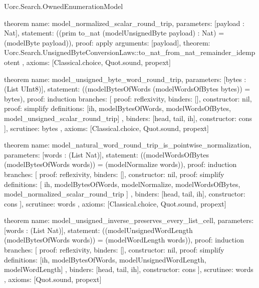 \begin{lexlean}{Uorc.Search.OwnedEnumerationModel}
\begin{semanticmodule}
theorem{
  name: model_normalized_scalar_round_trip,
  parameters: [payload : Nat],
  statement: ((prim to_nat (modelUnsignedByte payload) : Nat) = (modelByte payload)),
  proof: apply{
    arguments: [payload],
    theorem: Uorc.Search.UnsignedByteConversionLaws::to_nat_from_nat_remainder_idempotent
  },
  axioms: [Classical.choice, Quot.sound, propext]
}

theorem{
  name: model_unsigned_byte_word_round_trip,
  parameters: [bytes : (List UInt8)],
  statement: ((modelBytesOfWords (modelWordsOfBytes bytes)) = bytes),
  proof: induction{
    branches: [
      {proof: reflexivity{}, binders: [], constructor: nil},
      {
        proof: simplify{
          definitions: [ih, modelBytesOfWords, modelWordsOfBytes, model_unsigned_scalar_round_trip]
        },
        binders: [head, tail, ih],
        constructor: cons
      }
    ],
    scrutinee: bytes
  },
  axioms: [Classical.choice, Quot.sound, propext]
}

theorem{
  name: model_natural_word_round_trip_is_pointwise_normalization,
  parameters: [words : (List Nat)],
  statement: ((modelWordsOfBytes (modelBytesOfWords words)) = (modelNormalize words)),
  proof: induction{
    branches: [
      {proof: reflexivity{}, binders: [], constructor: nil},
      {
        proof: simplify{
          definitions: [
            ih,
            modelBytesOfWords,
            modelNormalize,
            modelWordsOfBytes,
            model_normalized_scalar_round_trip
          ]
        },
        binders: [head, tail, ih],
        constructor: cons
      }
    ],
    scrutinee: words
  },
  axioms: [Classical.choice, Quot.sound, propext]
}

theorem{
  name: model_unsigned_inverse_preserves_every_list_cell,
  parameters: [words : (List Nat)],
  statement: ((modelUnsignedWordLength (modelBytesOfWords words)) = (modelWordLength words)),
  proof: induction{
    branches: [
      {proof: reflexivity{}, binders: [], constructor: nil},
      {
        proof: simplify{
          definitions: [ih, modelBytesOfWords, modelUnsignedWordLength, modelWordLength]
        },
        binders: [head, tail, ih],
        constructor: cons
      }
    ],
    scrutinee: words
  },
  axioms: [Quot.sound, propext]
}


\end{semanticmodule}
\end{lexlean}
